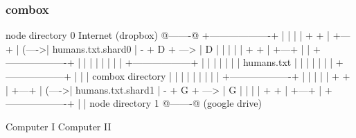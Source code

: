 \begin{frame}[fragile]
  \frametitle{combox}

  {\tiny
  \begin{semiverbatim}

         node directory 0                Internet
         (dropbox)                       @-------@
        +-------------------+            |       |
        |                   |    + +     | +---+ |
  (---->| humans.txt.shard0 | - + D + ---> | D | |
  |     |                   |    + +     | +---+ |
  |     +-------------------+            |       |
  |                                      |       |
  |                                      |       |
 +------------------+                    |       |
 |                  |                    |       |
 |  humans.txt      |                    |       |
 |                  |                    |       |
 +------------------+                    |       |
  |  combox directory                    |       |
  |                                      |       |
  |                                      |       |
  |     +-------------------+            |       |
  |     |                   |    + +     | +---+ |
  (---->| humans.txt.shard1 | - + G + ---> | G | |
        |                   |    + +     | +---+ |
        +-------------------+            |       |
         node directory 1                @-------@
         (google drive)

  Computer I                                                                    Computer II
  \end{semiverbatim}
  }

\end{frame}


